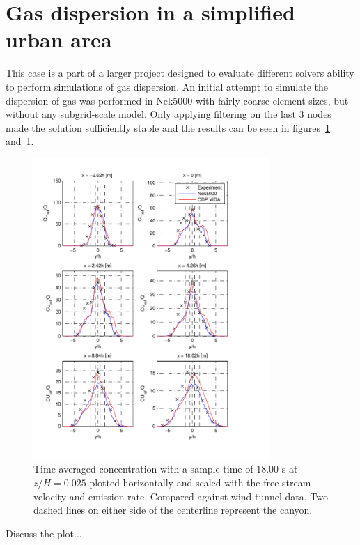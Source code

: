 \section{Gas dispersion in a simplified urban area} 
This case is a part of a larger project designed to evaluate different solvers 
ability to perform simulations of gas dispersion. An initial attempt to simulate the 
dispersion of gas was performed in Nek5000 with fairly coarse element sizes, but without
any subgrid-scale model. Only applying filtering on the last 3 nodes made the solution 
sufficiently stable and the results can be seen in figures~\ref{fig:cHfilter} and~\ref{fig:cHfilter}.
%
\begin{figure}[h]
	\centering
	\includegraphics[width=0.8\textwidth]{Figures/NekcH.pdf}
	\caption{Time-averaged concentration with a sample time of $18.00$ s at $z/H = 0.025$ plotted horizontally and scaled 
	with the free-stream velocity and emission rate. Compared against wind tunnel data.
Two dashed lines on either side of the centerline represent the canyon.}
	\label{fig:cHfilter}
\end{figure}
%
Discuss the plot... 

